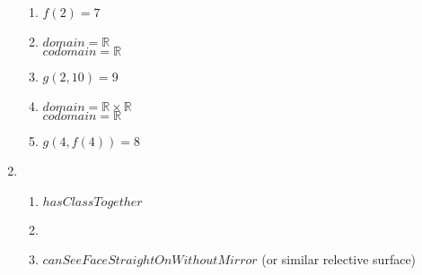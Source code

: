 \documentclass{article}
\begin{document}
\begin{enumerate}
        \begin{enumerate}
            \item $f(2) = 7$
            \item
                $domain = \mathbb{R}$ \\
                $codomain = \mathbb{R}$
            \item $g(2,10) = 9$
            \item
                $domain = \mathbb{R} \times \mathbb{R}$ \\
                $codomain = \mathbb{R}$
            \item $g(4,f(4)) = 8$
        \end{enumerate}
    \item %
        \begin{enumerate}
            \item $hasClassTogether$
            \item %
            \item $canSeeFaceStraightOnWithoutMirror$ (or similar relective surface)
        \end{enumerate}
\end{enumerate}
\end{document}
